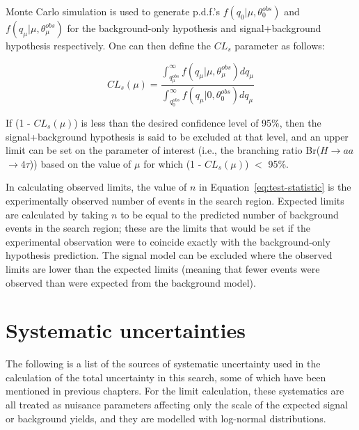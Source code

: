 Monte Carlo simulation is used to generate p.d.f.'s $f(q_{0}\vert\mu,\theta^{obs}_{0})$ and $f(q_{\mu}\vert\mu,\theta^{obs}_{\mu})$ for the background-only hypothesis and signal+background hypothesis respectively. One can then define the $CL_{s}$ parameter as follows:

\begin{equation}
CL_{s}(\mu) = \frac{\int_{q^{obs}_{\mu}}^{\infty} f(q_{\mu}\vert\mu,\theta^{obs}_{\mu}) dq_{\mu}}{\int_{q^{obs}_{0}}^{\infty} f(q_{\mu}\vert0,\theta^{obs}_{0}) dq_{\mu}}
\label{eq:CLS-def}
\end{equation}

If (1 - $CL_{s}(\mu)$) is less than the desired confidence level of 95\%, then the signal+background hypothesis is said to be excluded at that level, and an upper limit can be set on the parameter of interest (i.e., the branching ratio Br($H\rightarrow$$aa$$\rightarrow4\tau$)) based on the value of $\mu$ for which (1 - $CL_{s}(\mu)$) $<$ 95\%.

In calculating observed limits, the value of $n$ in Equation~\ref{eq:test-statistic} is the experimentally observed number of events in the search region. Expected limits are calculated by taking $n$ to be equal to the predicted number of background events in the search region; these are the limits that would be set if the experimental observation were to coincide exactly with the background-only hypothesis prediction. The signal model can be excluded where the observed limits are lower than the expected limits (meaning that fewer events were observed than were expected from the background model).

\section{Systematic uncertainties\label{sec:results-systematics}}

The following is a list of the sources of systematic uncertainty used in the calculation of the total uncertainty in this search, some of which have been mentioned in previous chapters. For the limit calculation, these systematics are all treated as nuisance parameters affecting only the scale of the expected signal or background yields, and they are modelled with log-normal distributions.

